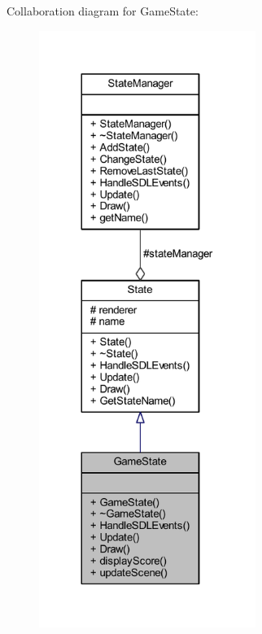 Collaboration diagram for Game\+State\+:
\nopagebreak
\begin{figure}[H]
\begin{center}
\leavevmode
\includegraphics[height=550pt]{class_game_state__coll__graph}
\end{center}
\end{figure}
